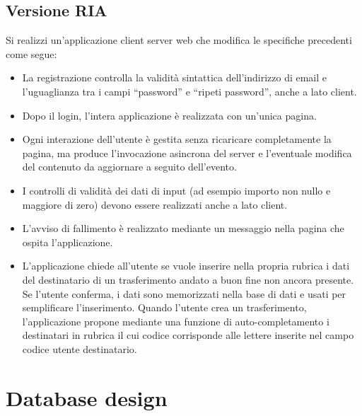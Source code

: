 \documentclass{article}
\begin{document}
\subsection{Versione RIA}
Si realizzi un’applicazione client server web che modifica le specifiche precedenti come segue:
\begin{itemize}
\item La registrazione controlla la validità sintattica dell’indirizzo di email e l’uguaglianza tra
i campi “password” e “ripeti password”, anche a lato client.
\item Dopo il login, l’intera applicazione è realizzata con un’unica pagina.
\item 	Ogni interazione dell’utente è gestita senza ricaricare completamente la pagina, ma
produce l’invocazione asincrona del server e l’eventuale modifica del contenuto da
aggiornare a seguito dell’evento.
\item I controlli di validità dei dati di input (ad esempio importo non nullo e maggiore di zero)
devono essere realizzati anche a lato client.
\item L’avviso di fallimento è realizzato mediante un messaggio nella pagina che ospita
l’applicazione.
\item L’applicazione chiede all’utente se vuole inserire nella propria rubrica i dati del
destinatario di un trasferimento andato a buon fine non ancora presente. Se l’utente
conferma, i dati sono memorizzati nella base di dati e usati per semplificare
l’inserimento. Quando l’utente crea un trasferimento, l’applicazione propone mediante
una funzione di auto-completamento i destinatari in rubrica il cui codice corrisponde
alle lettere inserite nel campo codice utente destinatario.
\end{itemize}

\pagebreak
\section{Database design}
\end{document}
